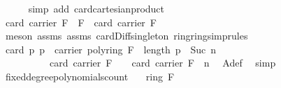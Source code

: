 \begin{isabellebody}
\ \ \ \ \isamarkupfalse%
\ {\isacharparenleft}{\kern0pt}simp\ add{\isacharcolon}{\kern0pt}\ card{\isacharunderscore}{\kern0pt}cartesian{\isacharunderscore}{\kern0pt}product{\isacharparenright}{\kern0pt}\isanewline
\ \ \isamarkupfalse%
\ \isamarkupfalse%
\ {\isachardoublequoteopen}card\ {\isacharparenleft}{\kern0pt}carrier\ F\ {\isacharminus}{\kern0pt}\ {\isacharbraceleft}{\kern0pt}{\isasymzero}\isactrlbsub F\isactrlesub {\isacharbraceright}{\kern0pt}{\isacharparenright}{\kern0pt}\ {\isacharequal}{\kern0pt}\ card\ {\isacharparenleft}{\kern0pt}carrier\ F{\isacharparenright}{\kern0pt}\ {\isacharminus}{\kern0pt}\ {}{\isachardoublequoteclose}\ \isanewline
\ \ \ \ \isamarkupfalse%
\ {\isacharparenleft}{\kern0pt}meson\ assms{\isacharparenleft}{\kern0pt}{}{\isacharparenright}{\kern0pt}\ assms{\isacharparenleft}{\kern0pt}{}{\isacharparenright}{\kern0pt}\ card{\isacharunderscore}{\kern0pt}Diff{\isacharunderscore}{\kern0pt}singleton\ ring{\isachardot}{\kern0pt}ring{\isacharunderscore}{\kern0pt}simprules{\isacharparenleft}{\kern0pt}{}{\isacharparenright}{\kern0pt}{\isacharparenright}{\kern0pt}\isanewline
\ \ \isamarkupfalse%
\ \isamarkupfalse%
\ {\isachardoublequoteopen}card\ {\isacharparenleft}{\kern0pt}{\isacharbraceleft}{\kern0pt}p{\isachardot}{\kern0pt}\ p\ {\isasymin}\ carrier\ {\isacharparenleft}{\kern0pt}poly{\isacharunderscore}{\kern0pt}ring\ F{\isacharparenright}{\kern0pt}\ {\isasymand}\ length\ p\ {\isacharequal}{\kern0pt}\ Suc\ n{\isacharbraceright}{\kern0pt}{\isacharparenright}{\kern0pt}\ {\isacharequal}{\kern0pt}\ \isanewline
\ \ \ \ \ \ \ \ \ \ {\isacharparenleft}{\kern0pt}card\ {\isacharparenleft}{\kern0pt}carrier\ F{\isacharparenright}{\kern0pt}\ {\isacharminus}{\kern0pt}\ {}{\isacharparenright}{\kern0pt}\ {\isacharasterisk}{\kern0pt}\ {\isacharparenleft}{\kern0pt}card\ {\isacharparenleft}{\kern0pt}carrier\ F{\isacharparenright}{\kern0pt}\ {\isacharcircum}{\kern0pt}\ n{\isacharparenright}{\kern0pt}{\isachardoublequoteclose}\ \isamarkupfalse%
\ A{\isacharunderscore}{\kern0pt}def\ \isamarkupfalse%
\ simp\isanewline
{}\isamarkupfalse%
%
\endisatagproof
{\isafoldproof}%
%
\isadelimproof
\isanewline
%
\endisadelimproof
\isanewline
{}\isamarkupfalse%
\ fixed{\isacharunderscore}{\kern0pt}degree{\isacharunderscore}{\kern0pt}polynomials{\isacharunderscore}{\kern0pt}count{\isacharcolon}{\kern0pt}\isanewline
\ \ \ {\isachardoublequoteopen}ring\ F{\isachardoublequoteclose}\isanewline

\end{isabellebody}
